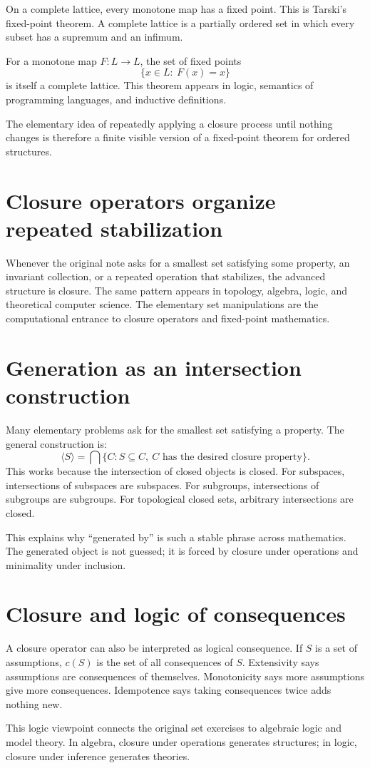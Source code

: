 On a complete lattice, every monotone map has a fixed point.  This is Tarski's fixed-point theorem.  A complete lattice is a partially ordered set in which every subset has a supremum and an infimum.

For a monotone map $F:L\to L$, the set of fixed points
\[
  \{x\in L:\ F(x)=x\}
\]
is itself a complete lattice.  This theorem appears in logic, semantics of programming languages, and inductive definitions.

The elementary idea of repeatedly applying a closure process until nothing changes is therefore a finite visible version of a fixed-point theorem for ordered structures.

\section{Closure operators organize repeated stabilization}

Whenever the original note asks for a smallest set satisfying some property, an invariant collection, or a repeated operation that stabilizes, the advanced structure is closure.  The same pattern appears in topology, algebra, logic, and theoretical computer science.  The elementary set manipulations are the computational entrance to closure operators and fixed-point mathematics.

\section{Generation as an intersection construction}

Many elementary problems ask for the smallest set satisfying a property.  The general construction is:
\[
  \langle S\rangle=\bigcap\{C:S\subseteq C,\ C\text{ has the desired closure property}\}.
\]
This works because the intersection of closed objects is closed.  For subspaces, intersections of subspaces are subspaces.  For subgroups, intersections of subgroups are subgroups.  For topological closed sets, arbitrary intersections are closed.

This explains why ``generated by'' is such a stable phrase across mathematics.  The generated object is not guessed; it is forced by closure under operations and minimality under inclusion.

\section{Closure and logic of consequences}

A closure operator can also be interpreted as logical consequence.  If $S$ is a set of assumptions, $c(S)$ is the set of all consequences of $S$.  Extensivity says assumptions are consequences of themselves.  Monotonicity says more assumptions give more consequences.  Idempotence says taking consequences twice adds nothing new.

This logic viewpoint connects the original set exercises to algebraic logic and model theory.  In algebra, closure under operations generates structures; in logic, closure under inference generates theories.
